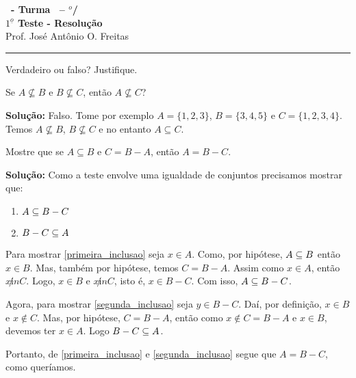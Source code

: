\documentclass[12pt]{exam}
\begin{document}
\begin{center}
{\Large\bf \disciplina\ - Turma \turma\ -- \semestre$^{o}$/\ano} \\ \vspace{9pt} {\large\bf
$1^{\underline{o}}$ Teste - Resolu\c{c}\~ao}\\
\vspace{9pt} Prof. Jos{\'e} Ant{\^o}nio O. Freitas
\end{center}
\hrule

\vspace{.6cm}


\vspace{.6cm}

\questao Verdadeiro ou falso? Justifique.
\begin{center}
    Se $A \nsubseteq B$ e $B \nsubseteq C$, ent\~ao $A \nsubseteq C$?
\end{center}

\noindent\textbf{Solu\c{c}\~ao:} Falso. Tome por exemplo $A = \{1, 2, 3\}$, $B = \{3, 4, 5\}$ e $C = \{1, 2, 3, 4\}$. Temos $A \nsubseteq B$, $B \nsubseteq C$ e no entanto $A \subseteq C$.

\vspace{.5cm}

\questao Mostre que se $A \subseteq B$ e $C = B - A$, ent\~ao $A = B - C$.

\noindent\textbf{Solu\c{c}\~ao:} Como a teste envolve uma igualdade de conjuntos precisamos mostrar que:
\begin{enumerate}
    \item $A \subseteq B - C$\label{primeira_inclusao}
    \item $B - C \subseteq A$\label{segunda_inclusao}
\end{enumerate}

Para mostrar \eqref{primeira_inclusao} seja $x \in A$. Como, por hipótese, $A \subseteq B$ então $x \in B$. Mas, também por hipótese, temos $C = B - A$. Assim como $x \in A$, então $x \not in C$. Logo, $x \in B$ e $x \not in C$, isto é, $x \in B - C$. Com isso, $A \subseteq B - C$.

Agora, para mostrar \eqref{segunda_inclusao} seja $y \in B - C$. Daí, por definição, $x \in B$ e $x \notin C$. Mas, por hipótese, $C = B - A$, então como $x \notin C = B - A$ e $x \in B$, devemos ter $x \in A$. Logo $B - C \subseteq A$.

Portanto, de \eqref{primeira_inclusao} e \eqref{segunda_inclusao} segue que $A = B - C$, como queríamos.
\end{document}
